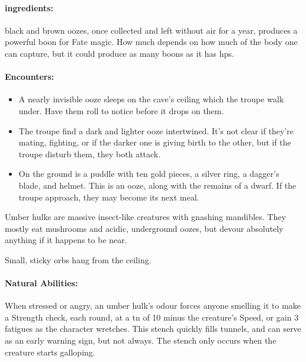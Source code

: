 \begin{multicols}{2}
\jelly


\paragraph{\Glspl{ingredient}:}
black and brown oozes, once collected and left without air for a year, produces a powerful \gls{boon} for Fate magic.
How much depends on how much of the body one can capture, but it could produce as many \glspl{boon} as it has \glspl{hp}.

\paragraph{Encounters:}

\begin{itemize}
  \item
  A nearly invisible ooze sleeps on the cave's ceiling which the troupe walk under.
  Have them roll  to notice before it drops on them.
  \item
  The troupe find a dark and lighter ooze intertwined.
  It's not clear if they're mating, fighting, or if the darker one is giving birth to the other, but if the troupe disturb them, they both attack.
  \item
  On the ground is a puddle with ten gold pieces, a silver ring, a dagger's blade, and helmet.
  This is an ooze, along with the remains of a dwarf.
  If the troupe approach, they may become its next meal.
\end{itemize}

\jelly

\label{umber_hulk}

Umber hulks are massive insect-like creatures with gnashing mandibles.
They mostly eat mushrooms and acidic, underground oozes, but devour absolutely anything if it happens to be near.

\begin{boxtext}

  Small, sticky orbs hang from the ceiling.

\end{boxtext}

\paragraph{Natural Abilities:} When stressed or angry, an umber hulk's odour forces anyone smelling it to make a Strength check, each round, at a \gls{tn} of 10 minus the creature's Speed, or gain 3 \glspl{fatigue} as the character wretches.
This stench quickly fills tunnels, and can serve as an early warning sign, but not always.
The stench only occurs when the creature starts galloping.


\end{multicols}
